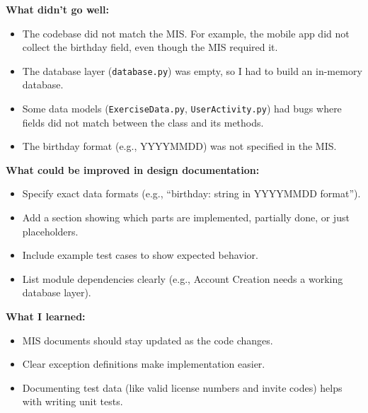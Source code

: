\documentclass[12pt, titlepage]{article}
\begin{document}
\begin{enumerate}
\begin{enumerate}
    \textbf{What didn't go well:}
    \begin{itemize}
      \item The codebase did not match the MIS. For example, the mobile app did not collect the birthday field, even though the MIS required it.
      \item The database layer (\texttt{database.py}) was empty, so I had to build an in-memory database.
      \item Some data models (\texttt{ExerciseData.py}, \texttt{UserActivity.py}) had bugs where fields did not match between the class and its methods.
      \item The birthday format (e.g., YYYYMMDD) was not specified in the MIS.
    \end{itemize}

    \textbf{What could be improved in design documentation:}
    \begin{itemize}
      \item Specify exact data formats (e.g., ``birthday: string in YYYYMMDD format'').
      \item Add a section showing which parts are implemented, partially done, or just placeholders.
      \item Include example test cases to show expected behavior.
      \item List module dependencies clearly (e.g., Account Creation needs a working database layer).
    \end{itemize}

    \textbf{What I learned:}
    \begin{itemize}
      \item MIS documents should stay updated as the code changes.
      \item Clear exception definitions make implementation easier.
      \item Documenting test data (like valid license numbers and invite codes) helps with writing unit tests.
    \end{itemize}
  \end{enumerate}
\end{enumerate}
\end{document}
